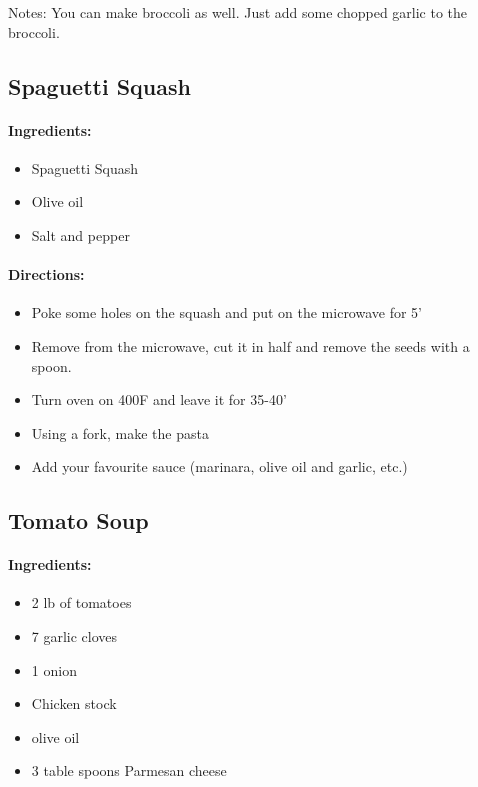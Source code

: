 \documentclass{article}
\begin{document}
Notes: You can make broccoli as well. Just add some chopped garlic to the broccoli.

\subsection{Spaguetti Squash}

\paragraph{Ingredients:}

\begin{itemize}
	\item Spaguetti Squash
	\item Olive oil
	\item Salt and pepper
	
\end{itemize}

\paragraph{Directions:}
\begin{itemize}
	\item Poke some holes on the squash and put on the microwave for 5'
	\item Remove from the microwave, cut it in half and remove the seeds with a spoon.
	\item Turn oven on 400F and leave it for 35-40'
	\item Using a fork, make the pasta
	\item Add your favourite sauce (marinara, olive oil and garlic, etc.)
\end{itemize}

\subsection{Tomato Soup}

\paragraph{Ingredients:}
\begin{itemize}
	\item 2 lb of tomatoes
	\item 7 garlic cloves
	\item 1 onion
	\item Chicken stock
	\item olive oil
	\item 3 table spoons Parmesan cheese
\end{itemize}
\end{document}
